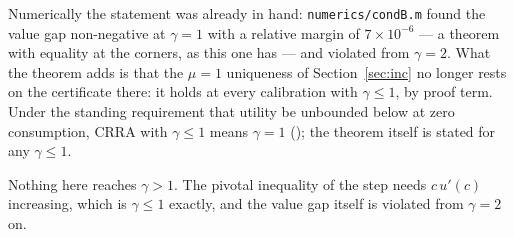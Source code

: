 Numerically the statement was already in hand: \texttt{numerics/condB.m} found the value gap
non-negative at $\gamma=1$ with a relative margin of $7\times10^{-6}$ --- a theorem with equality at
the corners, as this one has --- and violated from $\gamma=2$. What the theorem adds is that the
$\mu=1$ uniqueness of Section~\ref{sec:inc} no longer rests on the certificate there: it holds at
every calibration with $\gamma\le1$, by proof term. Under the standing requirement that utility be
unbounded below at zero consumption, CRRA with $\gamma\le1$ means $\gamma=1$
(); the theorem itself is stated for any $\gamma\le1$.

Nothing here reaches $\gamma>1$. The pivotal inequality of the step needs $c\,u'(c)$ increasing,
which is $\gamma\le1$ exactly, and the value gap itself is violated from $\gamma=2$ on.
